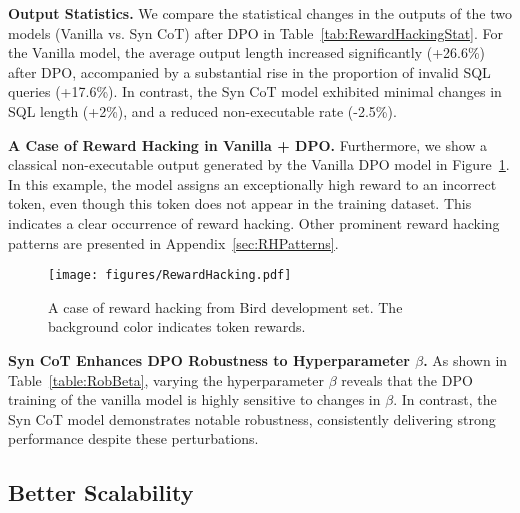 \textbf{Output Statistics.} We compare the statistical changes in the outputs of the two models (Vanilla vs. Syn CoT) after DPO in Table~\ref{tab:RewardHackingStat}. For the Vanilla model, the average output length increased significantly (+26.6\%) after DPO, accompanied by a substantial rise in the proportion of invalid SQL queries (+17.6\%).
In contrast, the Syn CoT model exhibited minimal changes in SQL length (+2\%), and a reduced non-executable rate (-2.5\%).



\textbf{A Case of Reward Hacking in Vanilla + DPO.} Furthermore, we show a classical non-executable output generated by the Vanilla DPO model in Figure~\ref{fig:RewardHackingCase}. In this example, the model assigns an exceptionally high reward to an incorrect token, even though this token does not appear in the training dataset. This indicates a clear occurrence of reward hacking. Other prominent reward hacking patterns are presented in Appendix~\ref{sec:RHPatterns}.

\begin{figure}[htbp]
  \centering
  \texttt{[image: figures/RewardHacking.pdf]}
  \caption{A case of reward hacking from Bird development set. The background color indicates token rewards.}
  \label{fig:RewardHackingCase}
\end{figure}

\textbf{Syn CoT Enhances DPO Robustness to Hyperparameter $\beta$.} As shown in Table~\ref{table:RobBeta}, varying the hyperparameter $\beta$ reveals that the DPO training of the vanilla model is highly sensitive to changes in $\beta$. In contrast, the Syn CoT model demonstrates notable robustness, consistently delivering strong performance despite these perturbations.

\subsection{Better Scalability}

